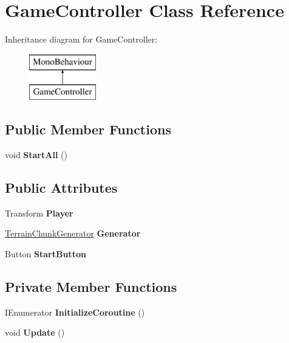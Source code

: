 \hypertarget{class_game_controller}{}\section{Game\+Controller Class Reference}
\label{class_game_controller}
Inheritance diagram for Game\+Controller\+:\begin{figure}[H]
\begin{center}
\leavevmode
\includegraphics[height=2.000000cm]{class_game_controller}
\end{center}
\end{figure}
\subsection*{Public Member Functions}
\begin{DoxyCompactItemize}
\item 
\mbox{\label{class_game_controller_af92d5b2ee2584650278552ee3c24ea3a}} 
void {\bfseries Start\+All} ()
\end{DoxyCompactItemize}
\subsection*{Public Attributes}
\begin{DoxyCompactItemize}
\item 
\mbox{\label{class_game_controller_a64f59289c9ce92fd83d8b6d09f946c05}} 
Transform {\bfseries Player}
\item 
\mbox{\label{class_game_controller_a3ac23e7cf43c628fcd71d1c53ec7d16d}} 
\hyperlink{class_terrain_generator_1_1_terrain_chunk_generator}{Terrain\+Chunk\+Generator} {\bfseries Generator}
\item 
\mbox{\label{class_game_controller_a1e1c1edc265cd869a3fd20f08be823f8}} 
Button {\bfseries Start\+Button}
\end{DoxyCompactItemize}
\subsection*{Private Member Functions}
\begin{DoxyCompactItemize}
\item 
\mbox{\label{class_game_controller_a80eee25051e4c89f3408c2ed3fb075e1}} 
I\+Enumerator {\bfseries Initialize\+Coroutine} ()
\item 
\mbox{\label{class_game_controller_a5a89277529cadb49af7d55eba3bbf056}} 
void {\bfseries Update} ()
\end{DoxyCompactItemize}

